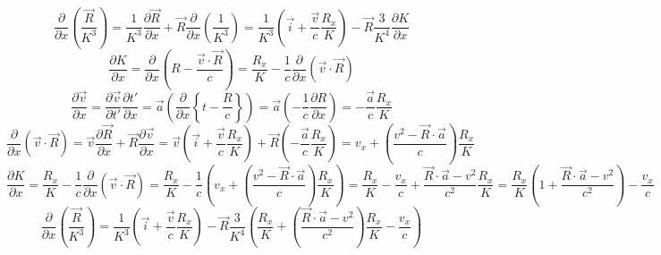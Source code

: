 \documentclass[11pt]{article}
\begin{document}
\[\frac{\partial }{\partial x}\left( \frac{\overrightarrow{R}}{{{K}^{3}}} \right)=\frac{1}{{{K}^{3}}}\frac{\partial \overrightarrow{R}}{\partial x}+\overrightarrow{R}\frac{\partial }{\partial x}\left( \frac{1}{{{K}^{3}}} \right)=\frac{1}{{{K}^{3}}}\left( \overrightarrow{i}+\frac{\overrightarrow{v}}{c}\frac{{{R}_{x}}}{K} \right)-\overrightarrow{R}\frac{3}{{{K}^{4}}}\frac{\partial K}{\partial x}\]
\[\frac{\partial K}{\partial x}=\frac{\partial }{\partial x}\left( R-\frac{\overrightarrow{v}\cdot \overrightarrow{R}}{c} \right)=\frac{{{R}_{x}}}{K}-\frac{1}{c}\frac{\partial }{\partial x}\left( \overrightarrow{v}\cdot \overrightarrow{R} \right)\]
\[\frac{\partial \overrightarrow{v}}{\partial x}=\frac{\partial \overrightarrow{v}}{\partial t'}\frac{\partial t'}{\partial x}=\overrightarrow{a}\left( \frac{\partial }{\partial x}\left\{ t-\frac{R}{c} \right\} \right)=\overrightarrow{a}\left( -\frac{1}{c}\frac{\partial R}{\partial x} \right)=-\frac{\overrightarrow{a}}{c}\frac{{{R}_{x}}}{K}\]
\[\frac{\partial }{\partial x}\left( \overrightarrow{v}\cdot \overrightarrow{R} \right)=\overrightarrow{v}\frac{\partial \overrightarrow{R}}{\partial x}+\overrightarrow{R}\frac{\partial \overrightarrow{v}}{\partial x}=\overrightarrow{v}\left( \overrightarrow{i}+\frac{\overrightarrow{v}}{c}\frac{{{R}_{x}}}{K} \right)+\overrightarrow{R}\left( -\frac{\overrightarrow{a}}{c}\frac{{{R}_{x}}}{K} \right)={{v}_{x}}+\left( \frac{{{v}^{2}}-\overrightarrow{R}\cdot \overrightarrow{a}}{c} \right)\frac{{{R}_{x}}}{K}\]
\[\frac{\partial K}{\partial x}=\frac{{{R}_{x}}}{K}-\frac{1}{c}\frac{\partial }{\partial x}\left( \overrightarrow{v}\cdot \overrightarrow{R} \right)=\frac{{{R}_{x}}}{K}-\frac{1}{c}\left( {{v}_{x}}+\left( \frac{{{v}^{2}}-\overrightarrow{R}\cdot \overrightarrow{a}}{c} \right)\frac{{{R}_{x}}}{K} \right)=\frac{{{R}_{x}}}{K}-\frac{{{v}_{x}}}{c}+\frac{\overrightarrow{R}\cdot \overrightarrow{a}-{{v}^{2}}}{{{c}^{2}}}\frac{{{R}_{x}}}{K}=\frac{{{R}_{x}}}{K}\left( 1+\frac{\overrightarrow{R}\cdot \overrightarrow{a}-{{v}^{2}}}{{{c}^{2}}} \right)-\frac{{{v}_{x}}}{c}\]
\[\frac{\partial }{\partial x}\left( \frac{\overrightarrow{R}}{{{K}^{3}}} \right)=\frac{1}{{{K}^{3}}}\left( \overrightarrow{i}+\frac{\overrightarrow{v}}{c}\frac{{{R}_{x}}}{K} \right)-\overrightarrow{R}\frac{3}{{{K}^{4}}}\left( \frac{{{R}_{x}}}{K}+\left( \frac{\overrightarrow{R}\cdot \overrightarrow{a}-{{v}^{2}}}{{{c}^{2}}} \right)\frac{{{R}_{x}}}{K}-\frac{{{v}_{x}}}{c} \right)\]
\end{document}
